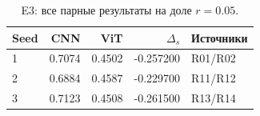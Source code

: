 \begin{table}[H]\centering\small
\setlength{\tabcolsep}{4pt}
\caption{E3: все парные результаты на доле $r=0.05$.}\label{tab:e3}
\begin{tabular}{lrrrl}
\toprule
Seed & CNN & ViT & $\Delta_s$ & Источники \\
\midrule
1 & 0.7074 & 0.4502 & -0.257200 & R01/R02 \\
2 & 0.6884 & 0.4587 & -0.229700 & R11/R12 \\
3 & 0.7123 & 0.4508 & -0.261500 & R13/R14 \\
\bottomrule
\end{tabular}
\end{table}
